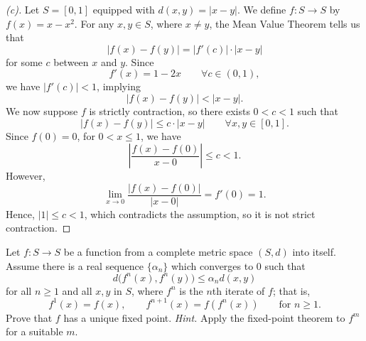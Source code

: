 \begin{proof}[(c)]
    Let $S=[0,1]$ equipped with $d(x,y)=|x-y|$. We define $f:S \to S$ by $f(x)=x-x^2$. For any $x,y \in S$, where $x \neq y$, the Mean Value Theorem tells us that 
    \[
    |f(x)-f(y)|=|f'(c)| \cdot |x-y|
    \]
    for some $c$ between $x$ and $y$. Since 
    \[
    f'(x)=1-2x \qquad \forall c \in (0,1),
    \]
    we have $|f'(c)|<1$, implying 
    \[
    |f(x)-f(y)|<|x-y|.
    \]
    We now suppose $f$ is strictly contraction, so there exists $0<c<1$ such that 
    \[
    |f(x)-f(y)| \le c \cdot |x-y| \qquad \forall x,y \in [0,1].
    \]
    Since $f(0)=0$, for $0 < x \le 1$, we have
    \[
    |\frac{f(x)-f(0)}{x-0}| \le c < 1.
    \]
    However, 
    \[
    \lim_{x \to 0} \frac{|f(x) - f(0)|}{|x-0|}=f'(0)=1.
    \]
    Hence, $|1| \le c < 1$, which contradicts the assumption, so it is not strict contraction.
\end{proof}

\begin{problem}
    Let \(f:S\to S\) be a function from a complete metric space \((S,d)\) into itself. Assume there is a real sequence \(\{\alpha_n\}\) which converges to \(0\) such that
    \[
    d\bigl(f^n(x),f^n(y)\bigr)\le \alpha_n d(x,y)
    \]
    for all \(n\ge 1\) and all \(x,y\) in \(S\), where \(f^n\) is the \(n\)th iterate of \(f\); that is,
    \[
    f^1(x)=f(x),\qquad f^{n+1}(x)=f(f^n(x)) \qquad \text{for } n\ge 1.
    \]
    Prove that \(f\) has a unique fixed point. \emph{Hint.} Apply the fixed-point theorem to \(f^m\) for a suitable \(m\).
\end{problem}

